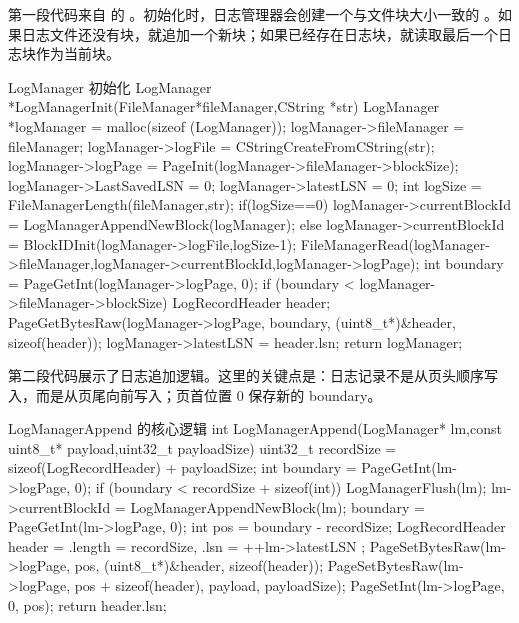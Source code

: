 第一段代码来自  的 。初始化时，日志管理器会创建一个与文件块大小一致的 。如果日志文件还没有块，就追加一个新块；如果已经存在日志块，就读取最后一个日志块作为当前块。

\begin{dbcode}{LogManager 初始化}
LogManager *LogManagerInit(FileManager*fileManager,CString *str){
    LogManager *logManager = malloc(sizeof (LogManager));
    logManager->fileManager = fileManager;
    logManager->logFile = CStringCreateFromCString(str);
    logManager->logPage = PageInit(logManager->fileManager->blockSize);
    logManager->LastSavedLSN = 0;
    logManager->latestLSN = 0;
    int logSize = FileManagerLength(fileManager,str);
    if(logSize==0){
        logManager->currentBlockId = LogManagerAppendNewBlock(logManager);
    }else{
        logManager->currentBlockId = BlockIDInit(logManager->logFile,logSize-1);
        FileManagerRead(logManager->fileManager,logManager->currentBlockId,logManager->logPage);
        int boundary = PageGetInt(logManager->logPage, 0);
        if (boundary < logManager->fileManager->blockSize) {
            LogRecordHeader header;
            PageGetBytesRaw(logManager->logPage, boundary, (uint8_t*)&header, sizeof(header));
            logManager->latestLSN = header.lsn;
        }
    }
    return logManager;
}
\end{dbcode}

第二段代码展示了日志追加逻辑。这里的关键点是：日志记录不是从页头顺序写入，而是从页尾向前写入；页首位置 0 保存新的 boundary。

\begin{dbcode}{LogManagerAppend 的核心逻辑}
int LogManagerAppend(LogManager* lm,const uint8_t* payload,uint32_t payloadSize) {
    uint32_t recordSize = sizeof(LogRecordHeader) + payloadSize;
    int boundary = PageGetInt(lm->logPage, 0);
    if (boundary < recordSize + sizeof(int)) {
        LogManagerFlush(lm);
        lm->currentBlockId = LogManagerAppendNewBlock(lm);
        boundary = PageGetInt(lm->logPage, 0);
    }
    int pos = boundary - recordSize;
    LogRecordHeader header = {
        .length = recordSize,
        .lsn = ++lm->latestLSN
    };
    PageSetBytesRaw(lm->logPage, pos,
                    (uint8_t*)&header, sizeof(header));
    PageSetBytesRaw(lm->logPage,
                    pos + sizeof(header),
                    payload, payloadSize);
    PageSetInt(lm->logPage, 0, pos);
    return header.lsn;
}
\end{dbcode}

